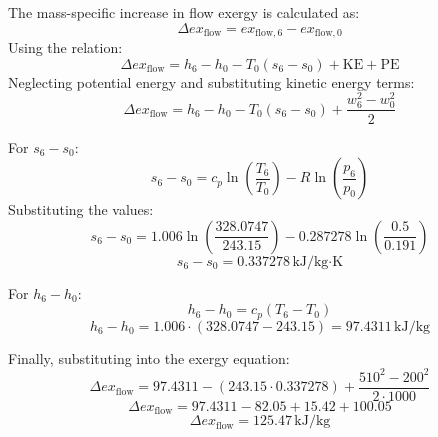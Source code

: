 The mass-specific increase in flow exergy is calculated as:  
\[
\Delta ex_{\text{flow}} = ex_{\text{flow},6} - ex_{\text{flow},0}
\]  
Using the relation:  
\[
\Delta ex_{\text{flow}} = h_6 - h_0 - T_0 (s_6 - s_0) + \text{KE} + \text{PE}
\]  
Neglecting potential energy and substituting kinetic energy terms:  
\[
\Delta ex_{\text{flow}} = h_6 - h_0 - T_0 (s_6 - s_0) + \frac{w_6^2 - w_0^2}{2}
\]  

For \( s_6 - s_0 \):  
\[
s_6 - s_0 = c_p \ln \left( \frac{T_6}{T_0} \right) - R \ln \left( \frac{p_6}{p_0} \right)
\]  
Substituting the values:  
\[
s_6 - s_0 = 1.006 \ln \left( \frac{328.0747}{243.15} \right) - 0.287278 \ln \left( \frac{0.5}{0.191} \right)
\]  
\[
s_6 - s_0 = 0.337278 \, \text{kJ/kg·K}
\]  

For \( h_6 - h_0 \):  
\[
h_6 - h_0 = c_p (T_6 - T_0)
\]  
\[
h_6 - h_0 = 1.006 \cdot (328.0747 - 243.15) = 97.4311 \, \text{kJ/kg}
\]  

Finally, substituting into the exergy equation:  
\[
\Delta ex_{\text{flow}} = 97.4311 - (243.15 \cdot 0.337278) + \frac{510^2 - 200^2}{2 \cdot 1000}
\]  
\[
\Delta ex_{\text{flow}} = 97.4311 - 82.05 + 15.42 + 100.05
\]  
\[
\Delta ex_{\text{flow}} = 125.47 \, \text{kJ/kg}
\]
